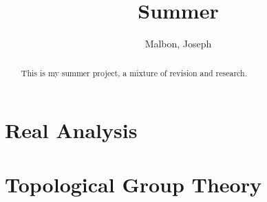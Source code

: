 \documentclass{article}
\title{Summer}
\author{Malbon, Joseph}
\theoremstyle{BreakBold}
\theoremstyle{example}
\theoremstyle{definition}
\begin{document}
\begin{titlingpage}
\maketitle
\begin{abstract}
This is my summer project, a mixture of revision and research.
\end{abstract}
\tableofcontents
\end{titlingpage}

\newpage
\section{Real Analysis}\label{sec:1}


\newpage
\section{Topological Group Theory}\label{sec:2}

\end{document}
